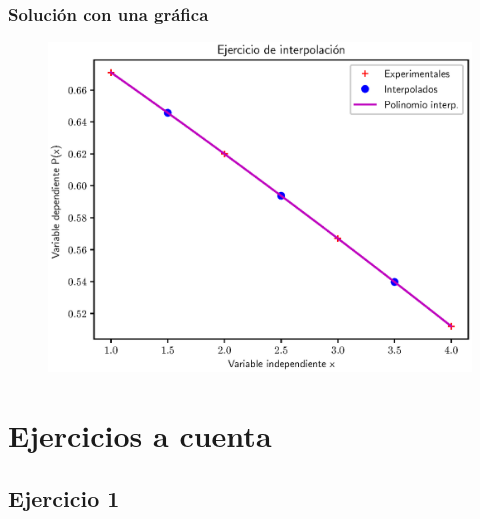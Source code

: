 \documentclass[12pt]{beamer}
\begin{document}
\begin{frame}
\frametitle{Solución con una gráfica}
\begin{figure}
    \centering
    \includegraphics[scale=0.58]{Imagenes/Ejercicio_Interpolacion_03.eps}
\end{figure}
\end{frame}
    

\section{Ejercicios a cuenta}
\subsection{Ejercicio 1}
\end{document}
